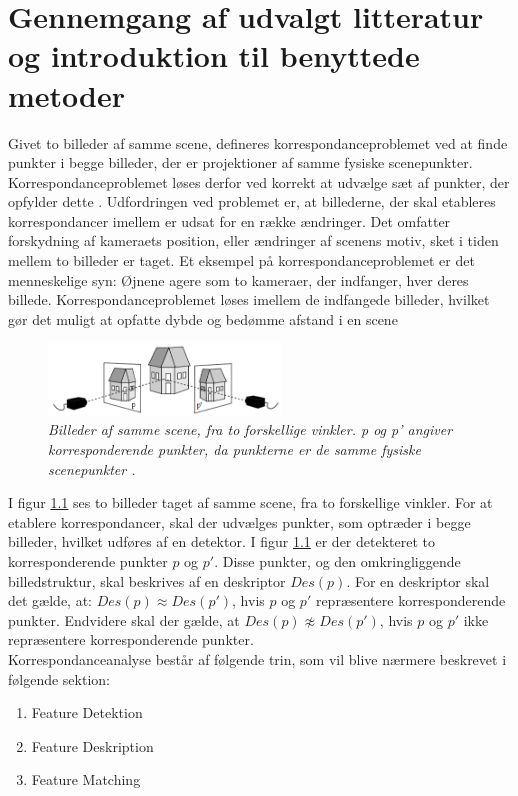 \chapter{Gennemgang af udvalgt litteratur og introduktion til benyttede metoder} \label{sec:Kor}

Givet to billeder af samme scene, defineres korrespondanceproblemet ved at finde punkter i begge billeder, der er projektioner af samme fysiske scenepunkter. Korrespondanceproblemet løses derfor ved korrekt at udvælge sæt af punkter, der opfylder dette \cite{Stefano}.  Udfordringen ved problemet er, at billederne, der skal etableres korrespondancer imellem er udsat for en række ændringer. Det omfatter forskydning af kameraets position, eller ændringer af scenens motiv, sket i tiden mellem to billeder er taget. Et eksempel på korrespondanceproblemet er det menneskelige syn: Øjnene agere som to kameraer, der indfanger, hver deres billede. Korrespondanceproblemet løses imellem de indfangede billeder, hvilket gør det muligt at opfatte dybde og bedømme afstand i en scene 
\begin{figure}[H]
    \centering
    \includegraphics[width=0.55\textwidth]{fig/3.png}
     \vspace{-1em}
    \begin{center}    
       \caption{{\footnotesize \textit{Billeder af samme scene, fra to forskellige vinkler. p og p' angiver korresponderende punkter, da punkterne er de samme fysiske scenepunkter \cite{kim}.}}}
    \label{fig:1}
     \end{center}
     \vspace{-2.5em}
  \end{figure} \noindent
I figur \ref{fig:1} ses to billeder taget af samme scene, fra to forskellige vinkler. For at etablere korrespondancer, skal der udvælges punkter, som optræder i begge billeder, hvilket udføres af en detektor. I figur \ref{fig:1} er der detekteret to korresponderende punkter $p$ og $p'$. Disse punkter, og den omkringliggende billedstruktur, skal beskrives af en deskriptor $Des(p)$. %
For en deskriptor skal det gælde, at: $Des(p)\approx Des(p')$, hvis $p$ og $p'$ repræsentere korresponderende punkter. Endvidere skal der gælde, at $Des(p)\not \approx Des(p')$, hvis $p$ og $p'$ ikke repræsentere korresponderende punkter. \\
Korrespondanceanalyse består af følgende trin, som vil blive nærmere beskrevet i følgende sektion:
\begin{enumerate}
\item{Feature Detektion}
\item{Feature Deskription}
\item{Feature Matching}
\end{enumerate}


